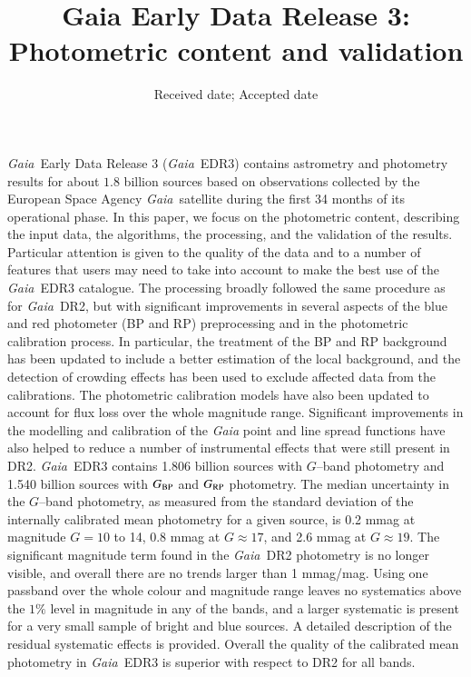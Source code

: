 \documentclass{aa}
\newcommand{\gaia}{\textit{Gaia}\xspace}
\newcommand{\gband}{$G$--band\xspace}
\newcommand{\gbp}{\ensuremath{G_{\rm BP}}\xspace}
\newcommand{\grp}{\ensuremath{G_{\rm RP}}\xspace}
\newcommand{\drt}{\gaia~DR2\xspace}
\newcommand{\edr}{\gaia~EDR3\xspace}
\newcommand{\xp}{BP and RP\xspace}
\begin{document}
 

\title{Gaia Early Data Release 3: Photometric content and validation}



\date{Received date; Accepted date}

\abstract
{\gaia\ Early Data Release 3 (\edr) contains astrometry and photometry results for about $1.8$ billion sources based on observations collected by the European Space Agency \gaia\ satellite during the first 34 months of its operational phase.}
{In this paper, we focus on the photometric content, describing the input data, the algorithms, the processing, and the validation of the results. Particular attention is given to the quality of the data and to a number of features that users may need to take into account to make the best use of the \edr catalogue.}
{The processing broadly followed the same procedure as for \drt, but with significant improvements in several aspects of the blue and red photometer (\xp) preprocessing and in the photometric calibration process. In particular, the treatment of the \xp background has been updated to include a better estimation of the local background, and the detection of crowding effects has been used to exclude affected data from the calibrations. The photometric calibration models have also been updated to account for flux loss over the whole magnitude range. Significant improvements in the modelling and calibration of the \gaia point and line spread functions have also helped to reduce a number of instrumental effects that were still present in DR2.}
{\edr contains 1.806 billion sources with \gband photometry and 1.540 billion sources with \gbp and \grp photometry. The median uncertainty in the \gband photometry, as measured from the standard deviation of the internally calibrated mean photometry for a given source, is 0.2 mmag at magnitude $G=10$ to 14, 0.8 mmag at $G\approx17$, and 2.6 mmag at $G\approx19$.
The significant magnitude term found in the \drt photometry is no longer visible, and overall there are no trends larger than 1 mmag/mag. Using one passband over the whole colour and magnitude range leaves no systematics above the $1\%$ level in magnitude in any of the bands, and a larger systematic is present for a very small sample of bright and blue sources. A detailed description of the residual systematic effects is provided.
Overall the quality of the calibrated mean photometry in \edr is superior with respect to DR2 for all bands.}
{}
\end{document}
